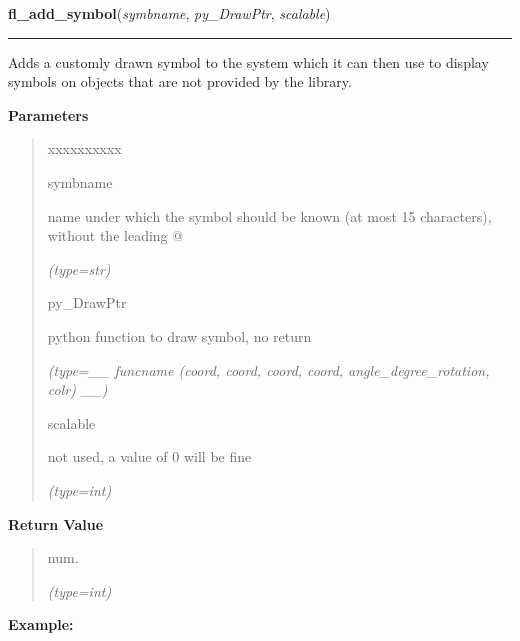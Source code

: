 \hspace{.8\funcindent}\begin{boxedminipage}{\funcwidth}

    \raggedright \textbf{fl\_add\_symbol}(\textit{symbname}, \textit{py\_DrawPtr}, \textit{scalable})

    \vspace{-1.5ex}

    \rule{\textwidth}{0.5\fboxrule}
\setlength{\parskip}{2ex}
    Adds a customly drawn symbol to the system which it can then use to 
    display symbols on objects that are not provided by the library.

\setlength{\parskip}{1ex}
      \textbf{Parameters}
      \vspace{-1ex}

      \begin{quote}
        \begin{Ventry}{xxxxxxxxxx}

          \item[symbname]

          name under which the symbol should be known (at most 15 
          characters), without the leading @

            {\it (type=str)}

          \item[py\_DrawPtr]

          python function to draw symbol, no return

            {\it (type=\_\_ funcname (coord, coord, coord, coord, angle\_degree\_rotation, colr) 
\_\_)}

          \item[scalable]

          not used, a value of 0 will be fine

            {\it (type=int)}

        \end{Ventry}

      \end{quote}

      \textbf{Return Value}
    \vspace{-1ex}

      \begin{quote}
      num.

      {\it (type=int)}

      \end{quote}

\textbf{Example:}
\begin{quote}
  \begin{itemize}


\end{itemize}
\end{quote}
\end{boxedminipage}
